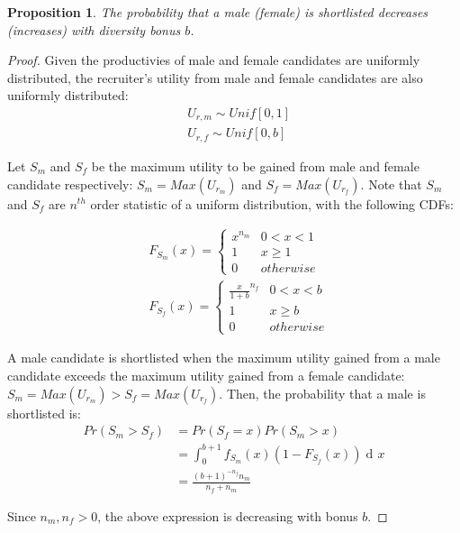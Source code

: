 \documentclass[11pt]{article}
\DeclareMathOperator{\di}{d\!}
\newcommand{\Unif}{\textit{Unif}[0,1]}
\newtheorem{proposition}{Proposition}
\begin{document}
\begin{proposition}
    The probability that a male (female) is shortlisted decreases (increases) with diversity bonus $b$.
\end{proposition}

\begin{proof}
    Given the productivies of male and female candidates are uniformly distributed, the recruiter's utility from male and female candidates are also uniformly distributed:
    \begin{align*}
         & U_{r,m} \sim \Unif              \\
         & U_{r,f} \sim \textit{Unif}[0,b]
    \end{align*}

    Let $S_m$ and $S_f$ be the maximum utility to be gained from male and female candidate respectively:
    $S_m=Max(U_{r_m})$ and $S_f=Max(U_{r_f})$. Note that $S_m$ and $S_f$ are $n^{th}$ order statistic of a uniform distribution, with the following CDFs:

    \begin{align*}
         & F_{S_m}(x) =
        \begin{cases}
            x^{n_m} & 0 < x < 1 \\
            1       & x \geq 1  \\
            0       & otherwise
        \end{cases}
        \\
         & F_{S_f}(x) =
        \begin{cases}
            \frac{x}{1+b}^{n_f} & 0 < x < b \\
            1                   & x \geq b  \\
            0                   & otherwise
        \end{cases}
    \end{align*}


    A male candidate is shortlisted when the maximum utility gained from a male candidate exceeds the maximum utility gained from a female candidate: $S_m=Max(U_{r_m}) > S_f=Max(U_{r_f})$. Then, the probability that a male is shortlisted is:
    \begin{align*}
        Pr(S_m > S_f) & = Pr(S_f = x) Pr(S_m > x)                        \\
                      & = \int_{0}^{b+1} f_{S_m}(x) (1-F_{S_f}(x)) \di x \\
                      & = \frac{(b+1)^{-n_f} n_m}{n_f+n_m}
    \end{align*}

    Since $n_m, n_f >0$, the above expression is decreasing with bonus $b$.

\end{proof}
\end{document}
